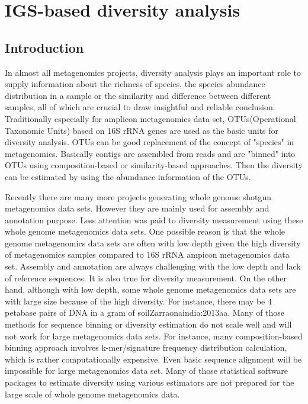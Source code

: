 \chapter{IGS-based diversity analysis}




\section{Introduction}

In almost all  metagenomics projects, diversity analysis plays an important
role to supply information about the richness of species, the species abundance
distribution in a sample or the similarity and difference between different 
samples, all of which are crucial to draw insightful and reliable conclusion. 
Traditionally especially for amplicon metagenomics data set, OTUs(Operational 
Taxonomic Units) based on 16S rRNA genes are used as the basic units for 
diversity analysis. OTUs can be good replacement of the concept of "species" in 
metagenomics. Basically contigs are assembled from reads and are "binned" into
OTUs using composition-based or similarity-based approaches. Then the diversity
can be estimated by using the abundance information of the OTUs.

Recently there are many more projects generating whole genome shotgun metagenomics data sets. However they are 
mainly used for assembly and annotation purpose. Less attention was paid to diversity measurement
using these whole genome metagenomics data sets. One possible reason is that the whole genome metagenomics
data sets are often with low depth given the high diversity of metagenomics samples compared to 16S rRNA
ampicon metagenomics data set. Assembly and annotation are always challenging with the low depth and lack of 
reference sequences. It is also true for diversity measurement. On the other hand, although with low depth, some whole genome metagenomics 
data sets are with large size because of the high diversity. For instance, there may be 4 petabase
pairs of DNA in a gram of soil{Zarraonaindia:2013aa}. Many of those methods for sequence binning or diversity 
estimation do not scale well and will not work for large metagenomics data sets. For instance,
many composition-based binning approach involves k-mer/signature frequency distribution calculation, which is 
rather computationally expensive. Even basic sequence alignment will be impossible for large metagenomics data set.
Many of those statistical software packages to estimate diversity using various estimators are not prepared 
for the large scale of whole genome metagenomics data. 


